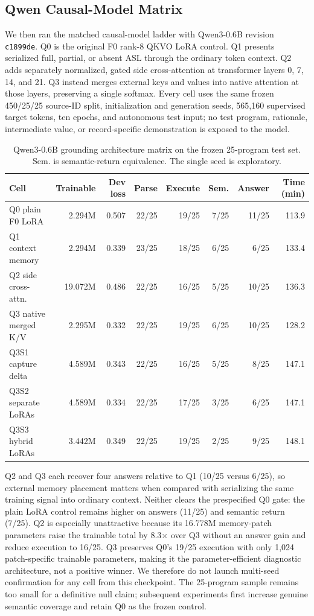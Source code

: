 \documentclass[11pt]{article}
\begin{document}
\subsection{Qwen Causal-Model Matrix}

We then ran the matched causal-model ladder with Qwen3-0.6B revision
\texttt{c1899de}. Q0 is the original F0 rank-8 QKVO LoRA control. Q1 presents
serialized full, partial, or absent ASL through the ordinary token context. Q2
adds separately normalized, gated side cross-attention at transformer layers
0, 7, 14, and 21. Q3 instead merges external keys and values into native
attention at those layers, preserving a single softmax. Every cell uses the
same frozen 450/25/25 source-ID split, initialization and generation seeds,
565,160 supervised target tokens, ten epochs, and autonomous test input; no
test program, rationale, intermediate value, or record-specific demonstration
is exposed to the model.

\begin{table}[t]
\centering\small
\caption{Qwen3-0.6B grounding architecture matrix on the frozen 25-program
test set. Sem. is semantic-return equivalence. The single seed is exploratory.}
\label{tab:asl-matrix-qwen}
\begin{tabular}{lrrrrrrr}
\toprule
Cell & Trainable & Dev loss & Parse & Execute & Sem. & Answer & Time (min)\\
\midrule
Q0 plain F0 LoRA & 2.294M & 0.507 & 22/25 & 19/25 & 7/25 & 11/25 & 113.9\\
Q1 context memory & 2.294M & 0.339 & 23/25 & 18/25 & 6/25 & 6/25 & 133.4\\
Q2 side cross-attn. & 19.072M & 0.486 & 22/25 & 16/25 & 5/25 & 10/25 & 136.3\\
Q3 native merged K/V & 2.295M & 0.332 & 22/25 & 19/25 & 6/25 & 10/25 & 128.2\\
Q3S1 capture delta & 4.589M & 0.343 & 22/25 & 16/25 & 5/25 & 8/25 & 147.1\\
Q3S2 separate LoRAs & 4.589M & 0.334 & 22/25 & 17/25 & 3/25 & 6/25 & 147.1\\
Q3S3 hybrid LoRAs & 3.442M & 0.349 & 22/25 & 19/25 & 2/25 & 9/25 & 148.1\\
\bottomrule
\end{tabular}
\end{table}

Q2 and Q3 each recover four answers relative to Q1 (10/25 versus 6/25), so
external memory placement matters when compared with serializing the same
training signal into ordinary context. Neither clears the prespecified Q0
gate: the plain LoRA control remains higher on answers (11/25) and semantic
return (7/25). Q2 is especially unattractive because its 16.778M memory-patch
parameters raise the trainable total by 8.3$\times$ over Q3 without an answer
gain and reduce execution to 16/25. Q3 preserves Q0's 19/25 execution with only
1,024 patch-specific trainable parameters, making it the parameter-efficient
diagnostic architecture, not a positive winner. We therefore do not launch
multi-seed confirmation for any cell from this checkpoint. The 25-program
sample remains too small for a definitive null claim; subsequent experiments
first increase genuine semantic coverage and retain Q0 as the frozen control.
\end{document}
